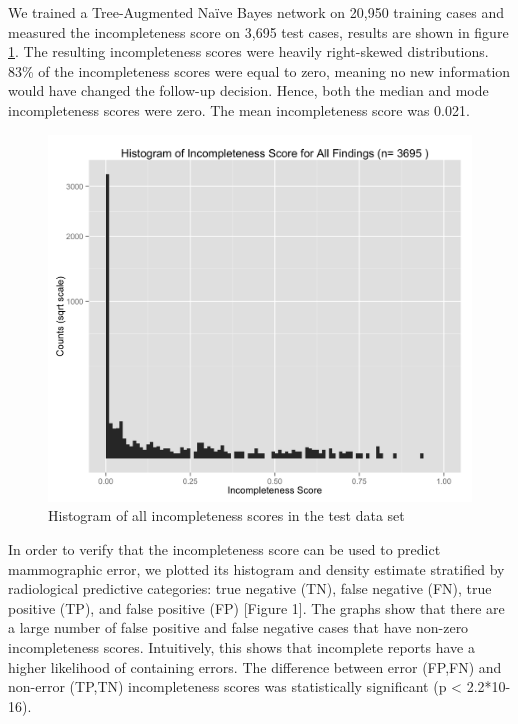 We trained a Tree-Augmented Naïve Bayes network on 20,950 training cases and measured the incompleteness score on 3,695 test cases, results are shown in figure \ref{fig:incompleteness_score_hist_all}. The resulting incompleteness scores were heavily right-skewed distributions. 83\% of the incompleteness scores were equal to zero, meaning no new information would have changed the follow-up decision. Hence, both the median and mode incompleteness scores were zero. The mean incompleteness score was 0.021.

\begin{figure}[h!]
\centering
\includegraphics[width=\linewidth]{figures/incompleteness_score_hist_all}
\caption{Histogram of all incompleteness scores in the test data set}
\label{fig:incompleteness_score_hist_all}
\end{figure}


In order to verify that the incompleteness score can be used to predict mammographic error, we plotted its histogram and density estimate stratified by radiological predictive categories: true negative (TN), false negative (FN), true positive (TP), and false positive (FP) [Figure 1]. The graphs show that there are a large number of false positive and false negative cases that have non-zero incompleteness scores. Intuitively, this shows that incomplete reports have a higher likelihood of containing errors. The difference between error (FP,FN) and non-error (TP,TN) incompleteness scores was statistically significant (p < 2.2*10-16). 

